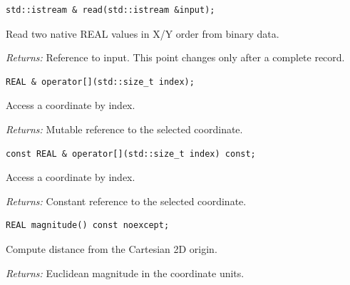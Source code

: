 \par\noindent\begin{minipage}{\linewidth}
\begin{lstlisting}[style=apireference]
std::istream & read(std::istream &input);
\end{lstlisting}
{\footnotesize Read two native REAL values in X/Y order from binary data.\par}
{\footnotesize\textit{Returns:} Reference to input. This point changes only after a complete record.\par}
\end{minipage}\par\vspace{1pt}
\par\noindent\begin{minipage}{\linewidth}
\begin{lstlisting}[style=apireference]
REAL & operator[](std::size_t index);
\end{lstlisting}
{\footnotesize Access a coordinate by index.\par}
{\footnotesize\textit{Returns:} Mutable reference to the selected coordinate.\par}
\end{minipage}\par\vspace{1pt}
\par\noindent\begin{minipage}{\linewidth}
\begin{lstlisting}[style=apireference]
const REAL & operator[](std::size_t index) const;
\end{lstlisting}
{\footnotesize Access a coordinate by index.\par}
{\footnotesize\textit{Returns:} Constant reference to the selected coordinate.\par}
\end{minipage}\par\vspace{1pt}
\par\noindent\begin{minipage}{\linewidth}
\begin{lstlisting}[style=apireference]
REAL magnitude() const noexcept;
\end{lstlisting}
{\footnotesize Compute distance from the Cartesian 2D origin.\par}
{\footnotesize\textit{Returns:} Euclidean magnitude in the coordinate units.\par}
\end{minipage}\par\vspace{1pt}
